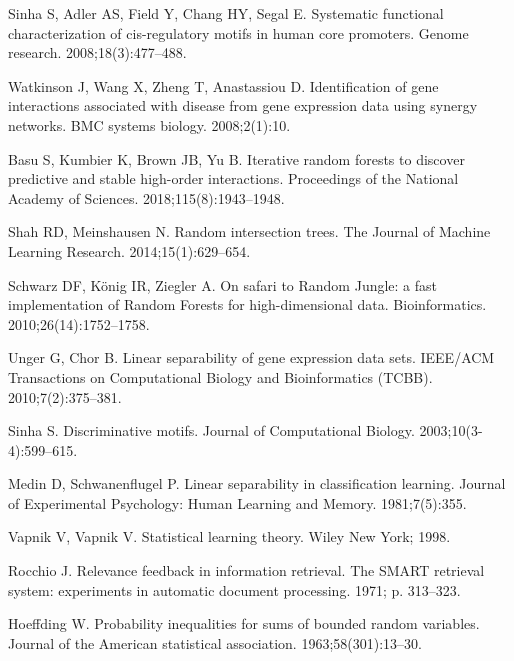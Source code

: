 \documentclass[10pt,letterpaper]{article}
\begin{document}
\begin{thebibliography}{10}
Sinha S, Adler AS, Field Y, Chang HY, Segal E.
\newblock Systematic functional characterization of cis-regulatory motifs in
  human core promoters.
\newblock Genome research. 2008;18(3):477--488.

Watkinson J, Wang X, Zheng T, Anastassiou D.
\newblock Identification of gene interactions associated with disease from gene
  expression data using synergy networks.
\newblock BMC systems biology. 2008;2(1):10.

Basu S, Kumbier K, Brown JB, Yu B.
\newblock Iterative random forests to discover predictive and stable high-order
  interactions.
\newblock Proceedings of the National Academy of Sciences.
  2018;115(8):1943--1948.

Shah RD, Meinshausen N.
\newblock Random intersection trees.
\newblock The Journal of Machine Learning Research. 2014;15(1):629--654.

Schwarz DF, K{\"o}nig IR, Ziegler A.
\newblock On safari to Random Jungle: a fast implementation of Random Forests
  for high-dimensional data.
\newblock Bioinformatics. 2010;26(14):1752--1758.

Unger G, Chor B.
\newblock Linear separability of gene expression data sets.
\newblock IEEE/ACM Transactions on Computational Biology and Bioinformatics
  (TCBB). 2010;7(2):375--381.

Sinha S.
\newblock Discriminative motifs.
\newblock Journal of Computational Biology. 2003;10(3-4):599--615.

Medin D, Schwanenflugel P.
\newblock Linear separability in classification learning.
\newblock Journal of Experimental Psychology: Human Learning and Memory.
  1981;7(5):355.

Vapnik V, Vapnik V.
\newblock Statistical learning theory.
\newblock Wiley New York; 1998.

Rocchio J.
\newblock Relevance feedback in information retrieval.
\newblock The SMART retrieval system: experiments in automatic document
  processing. 1971; p. 313--323.

Hoeffding W.
\newblock Probability inequalities for sums of bounded random variables.
\newblock Journal of the American statistical association. 1963;58(301):13--30.


\end{thebibliography}
\end{document}
